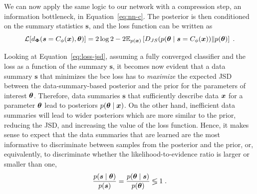 We can now apply the same logic to our network with a compression step, an information bottleneck, in Equation~\eqref{eq:nn-c}. The posterior is then conditioned on the summary statistics $\boldsymbol{s}$, and the loss function can be written as
\begin{equation} \label{eq:loss-jsd}
   \mathcal{L}[d_{\bm{\Phi}}(\boldsymbol{s} = C_\phi(\bm{x}), \bm{\theta})] = 2 \log2 - 2\mathbb{E}_{p(\bm{x})}\left[D_{JS}(p(\bm{\theta}\mid\boldsymbol{s} = C_\phi(\bm{x}))\| p(\bm{\theta})\right] \;.
\end{equation}

Looking at Equation~\eqref{eq:loss-jsd}, assuming a fully converged classifier and the loss as a function of the summary $\boldsymbol{s}$, it becomes now evident that a data summary $\boldsymbol{s}$ that minimizes the \gls*{bce} loss has to \emph{maximize} the expected JSD between the data-summary-based posterior and the prior for the parameters of interest $\bm{\theta}$. Therefore, data summaries $\boldsymbol{s}$ that sufficiently describe data $\bm{x}$ for a parameter $\bm{\theta}$ lead to posteriors $p(\bm{\theta}\mid\bm{x})$. On the other hand, inefficient data summaries will lead to wider posteriors which are more similar to the prior, reducing the JSD, and increasing the value of the loss function.  Hence, it makes sense to expect that the data summaries that are learned are the most informative to discriminate between samples from the posterior and the prior, or, equivalently, to discriminate whether the likelihood-to-evidence ratio is larger or smaller than one,
\begin{equation}
    \frac{p(\boldsymbol{s} \mid \bm{\theta})}{p(\boldsymbol{s})}  = 
    \frac{p(\bm{\theta}\mid \boldsymbol{s})}{p(\bm{\theta})} 
    \lessgtr 1\;.
\end{equation}


